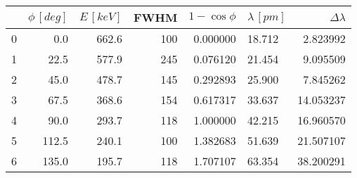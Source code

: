 \begin{tabular}{lrrrrlr}
\toprule
{} &  $\phi \, [deg]$ &  $E \, [keV]$ &  FWHM &  $1 - \cos \phi$ & $\lambda \, [pm]$ &  $\Delta \lambda$ \\
\midrule
0 &              0.0 &         662.6 &   100 &         0.000000 &            18.712 &          2.823992 \\
1 &             22.5 &         577.9 &   245 &         0.076120 &            21.454 &          9.095509 \\
2 &             45.0 &         478.7 &   145 &         0.292893 &            25.900 &          7.845262 \\
3 &             67.5 &         368.6 &   154 &         0.617317 &            33.637 &         14.053237 \\
4 &             90.0 &         293.7 &   118 &         1.000000 &            42.215 &         16.960570 \\
5 &            112.5 &         240.1 &   100 &         1.382683 &            51.639 &         21.507107 \\
6 &            135.0 &         195.7 &   118 &         1.707107 &            63.354 &         38.200291 \\
\bottomrule
\end{tabular}
